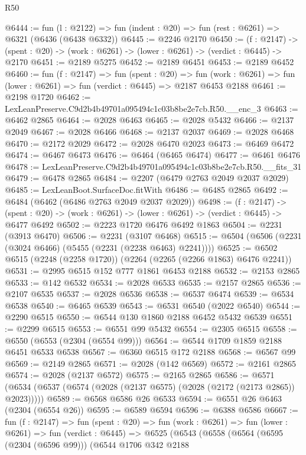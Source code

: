 \begin{lexlean}{R50}
\begin{coremodule}
@6444 := fun (l : @2122) => fun (indent : @20) => fun (rest : @6261) => @6321 (@6436 (@6438 @6332))
@6445 := @2246 @2170
@6450 := (f : @2147) ->
  (spent : @20) -> (work : @6261) -> (lower : @6261) -> (verdict : @6445) -> @2170
@6451 := @2189 @5275
@6452 := @2189 @6451
@6453 := @2189 @6452
@6460 := fun (f : @2147) =>
  fun (spent : @20) =>
  fun (work : @6261) => fun (lower : @6261) => fun (verdict : @6445) => @2187 @6453 @2188
@6461 := @2198 @1720
@6462 := LexLeanPreserve.C9d2b4b49701a095494c1c03b8be2e7cb.R50.__enc_3
@6463 := @6462 @2865
@6464 := @2028 @6463
@6465 := @2028 @5432
@6466 := @2137 @2049
@6467 := @2028 @6466
@6468 := @2137 @2037
@6469 := @2028 @6468
@6470 := @2172 @2029
@6472 := @2028 @6470 @2023
@6473 := @6469 @6472
@6474 := @6467 @6473
@6476 := @6464 (@6465 @6474)
@6477 := @6461 @6476
@6478 := LexLeanPreserve.C9d2b4b49701a095494c1c03b8be2e7cb.R50.__fits_31
@6479 := @6478 @2865
@6484 := @2207 (@6479 @2763 @2049 @2037 @2029)
@6485 := LexLeanBoot.SurfaceDoc.fitWith
@6486 := @6485 @2865
@6492 := @6484 (@6462 (@6486 @2763 @2049 @2037 @2029))
@6498 := (f : @2147) ->
  (spent : @20) -> (work : @6261) -> (lower : @6261) -> (verdict : @6445) -> @6477 @6492
@6502 := @2223 @1720 @6476 @6492 @1863
@6504 := @2231 (@3913 @6470)
@6506 := @2231 (@3107 @6468)
@6515 := @6504 (@6506 (@2231 (@3024 @6466) (@5455 (@2231 (@2238 @6463) @2241))))
@6525 := @6502 @6515 (@2248 (@2258 @1720)) (@2264 (@2265 (@2266 @1863) @6476 @2241))
@6531 := @2995 @6515 @152 @777 @1861 @6453 @2188
@6532 := @2153 @2865
@6533 := @142 @6532
@6534 := @2028 @6533
@6535 := @2157 @2865
@6536 := @2107 @6535
@6537 := @2028 @6536
@6538 := @6537 @6474
@6539 := @6534 @6538
@6540 := @6465 @6539
@6543 := @6531 @6540 (@2022 @6540)
@6544 := @2290 @6515
@6550 := @6544 @130 @1860 @2188 @6452 @5432 @6539
@6551 := @2299 @6515
@6553 := @6551 @99 @5432
@6554 := @2305 @6515
@6558 := @6550 (@6553 (@2304 (@6554 @99)))
@6564 := @6544 @1709 @1859 @2188 @6451 @6533 @6538
@6567 := @6360 @6515 @172 @2188
@6568 := @6567 @99
@6569 := @2149 @2865
@6571 := @2028 (@142 @6569)
@6572 := @2161 @2865
@6574 := @2028 (@2137 @6572)
@6575 := @2165 @2865
@6586 := @6571 (@6534 (@6537 (@6574 (@2028 (@2137 @6575) (@2028 (@2172 (@2173 @2865)) @2023)))))
@6589 := @6568 @6586 @26 @6533
@6594 := @6551 @26 @6463 (@2304 (@6554 @26))
@6595 := @6589 @6594
@6596 := @6388 @6586
@6667 := fun (f : @2147) =>
  fun (spent : @20) =>
  fun (work : @6261) =>
  fun (lower : @6261) =>
  fun (verdict : @6445) =>
  @6525
    (@6543
      (@6558
        (@6564
          (@6595 (@2304 (@6596 @99)))
          (@6544
            @1706
            @342
            @2188

\end{coremodule}
\end{lexlean}
